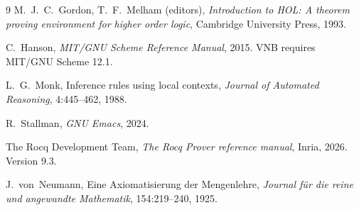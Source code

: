 \documentclass{amsbook}[openany]
\theoremstyle{definition}
\theoremstyle{remark}
\theoremstyle{remark}
\renewcommand{\[}{\par\smallskip\begin{lrbox}{\VNBdispbox}$\displaystyle}
\renewcommand{\]}{$\end{lrbox}%
    \noindent
    \ifdim\wd\VNBdispbox>\linewidth
      \resizebox{\linewidth}{!}{\usebox{\VNBdispbox}}%
    \else
      \hbox to \linewidth{\hfil\usebox{\VNBdispbox}\hfil}%
    \fi
    \par\smallskip}
\begin{document}
\begin{thebibliography}{9}
M.~J.~C.~Gordon, T.~F.~Melham (editors),
\textit{Introduction to HOL: A theorem proving environment for higher order logic},
Cambridge University Press, 1993.

C.~Hanson,
\textit{MIT/GNU Scheme Reference Manual}, 2015.  VNB requires MIT/GNU Scheme 12.1.

L.~G.~Monk,
Inference rules using local contexts,
\textit{Journal of Automated Reasoning}, 4:445--462, 1988.

R.~Stallman,
\textit{GNU Emacs}, 2024.

The Rocq Development Team,
\textit{The Rocq Prover reference manual}, Inria, 2026.  Version 9.3.

J.~von~Neumann,
Eine Axiomatisierung der Mengenlehre,
\textit{Journal f\"ur die reine und angewandte Mathematik}, 154:219--240, 1925.
\end{thebibliography}

\printindex
\end{document}

